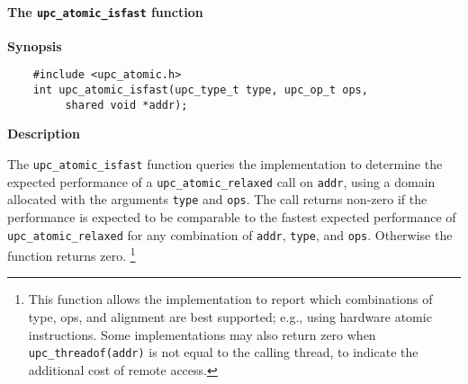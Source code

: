 \paragraph{The {\tt upc\_atomic\_isfast} function}

{\bf Synopsis}

\npf\vspace{-1.8em}
\begin{verbatim}
    #include <upc_atomic.h>
    int upc_atomic_isfast(upc_type_t type, upc_op_t ops,
         shared void *addr);
\end{verbatim}

{\bf Description}

\np The {\tt upc\_atomic\_isfast} function queries the implementation to determine
    the expected performance of a {\tt upc\_atomic\_relaxed} call on
    {\tt addr}, using a domain allocated with the arguments {\tt type} and
    {\tt ops}.  The call returns non-zero if the performance is expected to be
    comparable to the fastest expected performance of {\tt upc\_atomic\_relaxed}
    for any combination of {\tt addr}, {\tt type}, and {\tt ops}.  Otherwise
    the function returns zero.%
    \footnote{This function allows the implementation to report which
    combinations of type, ops, and alignment are best supported; e.g., using
    hardware atomic instructions.  Some implementations may also return zero
    when {\tt upc\_threadof(addr)} is not equal to the calling thread, to
    indicate the additional cost of remote access.}
